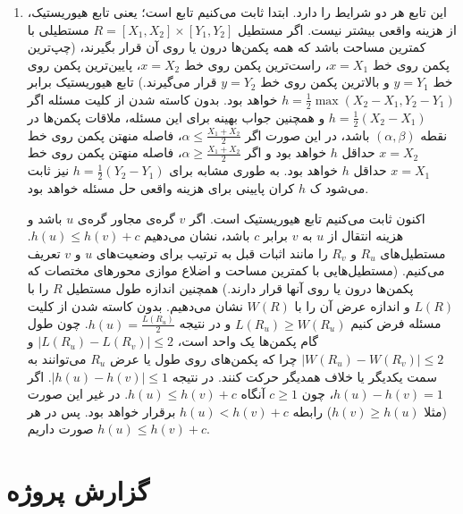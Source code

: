 \documentclass{article}
\begin{document}
\begin{enumerate}
	\item
	این تابع هر دو شرایط را دارد. ابتدا ثابت می‌‌کنیم تابع 
	است؛ یعنی تابع هیوریستیک، از هزینه واقعی بیشتر نیست. اگر مستطیل
	$R = [X_1, X_2] \times [Y_1, Y_2]$
	مستطیلی با کمترین مساحت باشد که همه پکمن‌ها درون یا روی آن قرار بگیرند، (چپ‌ترین پکمن روی خط $ x = X_1 $، راست‌ترین پکمن روی خط $ x = X_2 $، پایین‌ترین پکمن روی خط $ y = Y_1 $ و بالاترین پکمن روی خط $ y = Y_2 $ قرار می‌گیرند.) تابع هیوریستیک برابر 
	$h = \frac{1}{2}\max(X_2 - X_1, Y_2 - Y_1)$
	خواهد بود. بدون کاسته شدن از کلیت مسئله اگر 
	$h = \frac{1}{2}(X_2 - X_1)$
	و همچنین جواب بهینه برای این مسئله، ملاقات پکمن‌ها در نقطه 
	$(\alpha, \beta)$
	باشد، در این صورت اگر $\alpha \leq \frac{X_1 + X_2}{2}$، فاصله منهتن 
	پکمن روی خط 
	$x = X_2$
	حداقل $h$ خواهد بود و اگر $\alpha \geq \frac{X_1 + X_2}{2}$، فاصله منهتن پکمن روی خط 
	$x = X_1$
	حداقل $h$ خواهد بود. به طوری مشابه برای 
	$h = \frac{1}{2}(Y_2 - Y_1)$
	نیز ثابت می‌شود ک $h$ کران پایینی برای هزینه واقعی حل مسئله خواهد بود.
	
	اکنون ثابت می‌کنیم تابع هیوریستیک 
	است. اگر $v$ گره‌ی مجاور گره‌ی $u$ باشد و هزینه انتقال از $u$ به $v$ برابر $c$ باشد، نشان می‌دهیم 
	$h(u) \leq h(v) + c$.
مستطیل‌های $ R_u $ و $ R_v $ را مانند اثبات قبل به ترتیب برای وضعیت‌های $u$ و $v$ تعریف می‌کنیم. (مستطیل‌هایی با کمترین مساحت و اضلاع موازی محور‌های مختصات که پکمن‌ها درون یا روی آنها قرار دارند.) همچنین اندازه طول مستطیل $R$ را با $L(R)$ و اندازه عرض آن را با $W(R)$ نشان می‌دهیم. بدون کاسته شدن از کلیت مسئله فرض کنیم 
	$L(R_u) \geq W(R_u)$
و در نتیجه 
$h(u) = \frac{L(R_u)}{2}$.
چون طول گام پکمن‌ها یک واحد است،
$|L(R_u) - L(R_v)| \leq 2$
و
$|W(R_u) - W(R_v)| \leq 2$
چرا که پکمن‌های روی طول یا عرض $R_u$ می‌توانند به سمت یکدیگر یا خلاف همدیگر حرکت کنند. در نتیجه 
$|h(u) - h(v)| \leq 1$.
 اگر $h(u) - h(v) = 1$، چون $ c \geq 1 $ آنگاه 
 $h(u) \leq h(v) + c$. 
 در غیر این صورت (مثلا $h(v) \geq h(u)$) رابطه
  $h(u) < h(v) + c$
   برقرار خواهد بود. پس در هر صورت داریم 
   $h(u) \leq h(v) + c$.

	\end{enumerate}
					\section*{
			گزارش پروژه
		}
	
\end{document}
